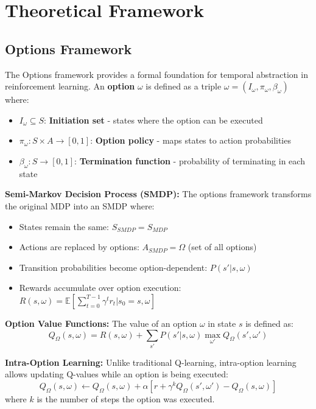 \documentclass[12pt]{article}
\begin{document}
{{\section{Theoretical Framework}

\subsection{Options Framework}

The Options framework provides a formal foundation for temporal abstraction in reinforcement learning. An \textbf{option} $\omega$ is defined as a triple $\omega = (I_\omega, \pi_\omega, \beta_\omega)$ where:

\begin{itemize}
    \item $I_\omega \subseteq S$: \textbf{Initiation set} - states where the option can be executed
    \item $\pi_\omega: S \times A \rightarrow [0,1]$: \textbf{Option policy} - maps states to action probabilities
    \item $\beta_\omega: S \rightarrow [0,1]$: \textbf{Termination function} - probability of terminating in each state
\end{itemize}

\textbf{Semi-Markov Decision Process (SMDP):}
The options framework transforms the original MDP into an SMDP where:
\begin{itemize}
    \item States remain the same: $S_{SMDP} = S_{MDP}$
    \item Actions are replaced by options: $A_{SMDP} = \Omega$ (set of all options)
    \item Transition probabilities become option-dependent: $P(s'|s,\omega)$
    \item Rewards accumulate over option execution: $R(s,\omega) = \mathbb{E}[\sum_{t=0}^{T-1} \gamma^t r_t | s_0 = s, \omega]$
\end{itemize}

\textbf{Option Value Functions:}
The value of an option $\omega$ in state $s$ is defined as:
\[
Q_\Omega(s,\omega) = R(s,\omega) + \sum_{s'} P(s'|s,\omega) \max_{\omega'} Q_\Omega(s',\omega')
\]

\textbf{Intra-Option Learning:}
Unlike traditional Q-learning, intra-option learning allows updating Q-values while an option is being executed:
\[
Q_\Omega(s,\omega) \leftarrow Q_\Omega(s,\omega) + \alpha[r + \gamma^k Q_\Omega(s',\omega') - Q_\Omega(s,\omega)]
\]
where $k$ is the number of steps the option was executed.

}}
\end{document}
